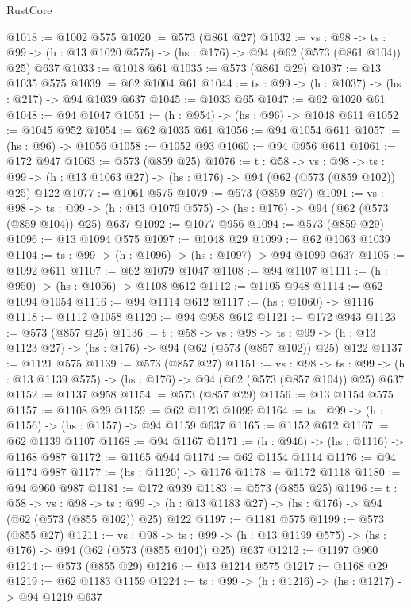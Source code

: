 \begin{lexlean}{RustCore}
\begin{coremodule}
@1018 := @1002 @575
@1020 := @573 (@861 @27)
@1032 := {vs : @98} ->
  {ts : @99} -> (h : @13 @1020 @575) -> (hs : @176) -> @94 (@62 (@573 (@861 @104)) @25) @637
@1033 := @1018 @61
@1035 := @573 (@861 @29)
@1037 := @13 @1035 @575
@1039 := @62 @1004 @61
@1044 := {ts : @99} -> (h : @1037) -> (hs : @217) -> @94 @1039 @637
@1045 := @1033 @65
@1047 := @62 @1020 @61
@1048 := @94 @1047
@1051 := (h : @954) -> (hs : @96) -> @1048 @611
@1052 := @1045 @952
@1054 := @62 @1035 @61
@1056 := @94 @1054 @611
@1057 := (hs : @96) -> @1056
@1058 := @1052 @93
@1060 := @94 @956 @611
@1061 := @172 @947
@1063 := @573 (@859 @25)
@1076 := {t : @58} ->
  {vs : @98} ->
  {ts : @99} -> (h : @13 @1063 @27) -> (hs : @176) -> @94 (@62 (@573 (@859 @102)) @25) @122
@1077 := @1061 @575
@1079 := @573 (@859 @27)
@1091 := {vs : @98} ->
  {ts : @99} -> (h : @13 @1079 @575) -> (hs : @176) -> @94 (@62 (@573 (@859 @104)) @25) @637
@1092 := @1077 @956
@1094 := @573 (@859 @29)
@1096 := @13 @1094 @575
@1097 := @1048 @29
@1099 := @62 @1063 @1039
@1104 := {ts : @99} -> (h : @1096) -> (hs : @1097) -> @94 @1099 @637
@1105 := @1092 @611
@1107 := @62 @1079 @1047
@1108 := @94 @1107
@1111 := (h : @950) -> (hs : @1056) -> @1108 @612
@1112 := @1105 @948
@1114 := @62 @1094 @1054
@1116 := @94 @1114 @612
@1117 := (hs : @1060) -> @1116
@1118 := @1112 @1058
@1120 := @94 @958 @612
@1121 := @172 @943
@1123 := @573 (@857 @25)
@1136 := {t : @58} ->
  {vs : @98} ->
  {ts : @99} -> (h : @13 @1123 @27) -> (hs : @176) -> @94 (@62 (@573 (@857 @102)) @25) @122
@1137 := @1121 @575
@1139 := @573 (@857 @27)
@1151 := {vs : @98} ->
  {ts : @99} -> (h : @13 @1139 @575) -> (hs : @176) -> @94 (@62 (@573 (@857 @104)) @25) @637
@1152 := @1137 @958
@1154 := @573 (@857 @29)
@1156 := @13 @1154 @575
@1157 := @1108 @29
@1159 := @62 @1123 @1099
@1164 := {ts : @99} -> (h : @1156) -> (hs : @1157) -> @94 @1159 @637
@1165 := @1152 @612
@1167 := @62 @1139 @1107
@1168 := @94 @1167
@1171 := (h : @946) -> (hs : @1116) -> @1168 @987
@1172 := @1165 @944
@1174 := @62 @1154 @1114
@1176 := @94 @1174 @987
@1177 := (hs : @1120) -> @1176
@1178 := @1172 @1118
@1180 := @94 @960 @987
@1181 := @172 @939
@1183 := @573 (@855 @25)
@1196 := {t : @58} ->
  {vs : @98} ->
  {ts : @99} -> (h : @13 @1183 @27) -> (hs : @176) -> @94 (@62 (@573 (@855 @102)) @25) @122
@1197 := @1181 @575
@1199 := @573 (@855 @27)
@1211 := {vs : @98} ->
  {ts : @99} -> (h : @13 @1199 @575) -> (hs : @176) -> @94 (@62 (@573 (@855 @104)) @25) @637
@1212 := @1197 @960
@1214 := @573 (@855 @29)
@1216 := @13 @1214 @575
@1217 := @1168 @29
@1219 := @62 @1183 @1159
@1224 := {ts : @99} -> (h : @1216) -> (hs : @1217) -> @94 @1219 @637

\end{coremodule}
\end{lexlean}
